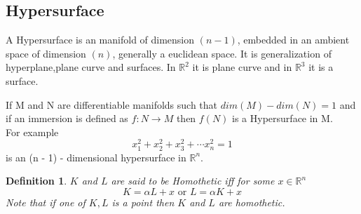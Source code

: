 \documentclass[oneside]{book}
\newtheorem{mydef}{Definition}[section]
\begin{document}
	
	
	
	
	
	
	
	
	
	
	
	
	
	
	
	
	
	
	
	
	
	
	
	
	
	
	
	
	
	
	
	
	
	
	
	
	\subsection{Hypersurface}
	\label{ss:10}
	A Hypersurface is an manifold of dimension $(n - 1)$, embedded in an ambient space of dimension $( n)$, generally a euclidean space. It is generalization of hyperplane,plane curve and surfaces. In $\mathbb{R}^2$ it is plane curve and in $\mathbb{R}^3$ it is a surface.
	
	
	If M and N are differentiable manifolds such that $dim(M)-dim(N) = 1 $ and if an immersion is defined as $f: N\rightarrow M$ then $f(N)$ is a Hypersurface in M.
	\\
	For example 
	\begin{equation*}
	x_{1}^2 + x_{2}^2+x_{3}^2+ \cdots x_{n}^2 = 1 
	\end{equation*}
	is an (n - 1) - dimensional hypersurface in $\mathbb{R}^n$.    
	
	
	\begin{mydef} \label{d:2}
		$K$ and $L$ are said to be Homothetic iff for some $x  \in \mathbb{R}^n$ \\
		$$K = \alpha L + x \text{ or } L=\alpha K+x $$
		Note that if one of $K, L $ is a point then $K $ and $L$ are homothetic.
	\end{mydef}
	
\end{document}
